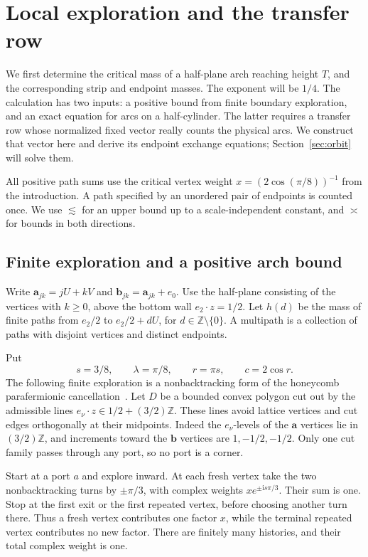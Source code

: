 \section{Local exploration and the transfer row}\label{c2:boundary}

We first determine the critical mass of a half-plane arch reaching height
$T$, and the corresponding strip and endpoint masses.  The exponent will
be $1/4$.  The calculation has two inputs: a positive bound from finite
boundary exploration, and an exact equation for arcs on a half-cylinder.
The latter requires a transfer row whose normalized fixed vector really
counts the physical arcs.  We construct that vector here and derive its
endpoint exchange equations; Section~\ref{sec:orbit} will solve them.

All positive path sums use the critical vertex weight
$x=(2\cos(\pi/8))^{-1}$ from the introduction.  A path specified by an
unordered pair of endpoints is counted once.  We use $\lesssim$ for an
upper bound up to a scale-independent constant, and $\asymp$ for bounds
in both directions.

\subsection{Finite exploration and a positive arch bound}

Write $\mathbf a_{jk}=jU+kV$ and $\mathbf b_{jk}=\mathbf a_{jk}+e_0$.
Use the half-plane consisting of the vertices with $k\ge0$, above the
bottom wall $e_2\cdot z=1/2$.  Let $h(d)$ be the mass of finite paths from
$e_2/2$ to $e_2/2+dU$, for $d\in\mathbb Z\setminus\{0\}$.  A multipath
is a collection of paths with disjoint vertices and distinct endpoints.

Put
\[
 s=3/8,\qquad \lambda=\pi/8,\qquad r=\pi s,\qquad c=2\cos r.
\]
The following finite exploration is a nonbacktracking form of the
honeycomb parafermionic cancellation~\cite{DuminilCopinSmirnov2012}.
Let $D$ be a bounded convex polygon cut out by the admissible lines
$e_\nu\cdot z\in1/2+(3/2)\mathbb Z$.  These lines avoid lattice
vertices and cut edges orthogonally at their midpoints.  Indeed the
$e_\nu$-levels of the $\mathbf a$ vertices lie in $(3/2)\mathbb Z$,
and increments toward the $\mathbf b$ vertices are $1,-1/2,-1/2$.
Only one cut family passes through any port, so no port is a corner.

Start at a port $a$ and explore inward.  At each fresh vertex take the two
nonbacktracking turns by $\pm\pi/3$, with complex weights
$xe^{\pm\mathrm i s\pi/3}$.  Their sum is one.  Stop at the first exit
or the first repeated vertex, before choosing another turn there.  Thus a
fresh vertex contributes one factor $x$, while the terminal repeated
vertex contributes no new factor.  There are finitely many histories,
and their total complex weight is one.

